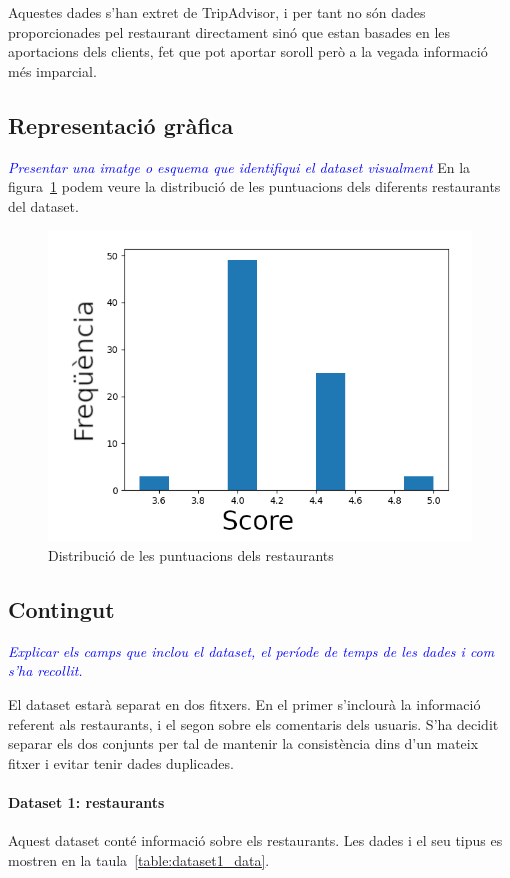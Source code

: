 \documentclass{article}
\newcommand\enunciat[2][blue]{\textcolor{#1}{\emph{#2}}}
\begin{document}
Aquestes dades s'han extret de TripAdvisor, i per tant no són dades
proporcionades pel restaurant directament sinó que estan basades en les
aportacions dels clients, fet que pot aportar soroll però a la vegada
informació més imparcial.


\subsection{Representació gràfica}
\enunciat{Presentar una imatge o esquema que identifiqui el dataset visualment}
En la figura~\ref{fig:plot} podem veure la distribució de les puntuacions
dels diferents restaurants del dataset.

\begin{figure}[h]
	\centering
	\includegraphics{plot.png}
	\caption{Distribució de les puntuacions dels restaurants}
	\label{fig:plot}
\end{figure}

\subsection{Contingut}\label{sec:contingut}
\enunciat{Explicar els camps que inclou el dataset, el període de temps de les
dades i com s'ha recollit.}

El dataset estarà separat en dos fitxers. En el primer s'inclourà la informació
referent als restaurants, i el segon sobre els comentaris dels usuaris. S'ha
decidit separar els dos conjunts per tal de mantenir la consistència dins d'un
mateix fitxer i evitar tenir dades duplicades.

\paragraph{Dataset 1: restaurants}
Aquest dataset conté informació sobre els restaurants. Les dades i el seu tipus
es mostren en la taula~\ref{table:dataset1_data}.
\end{document}
